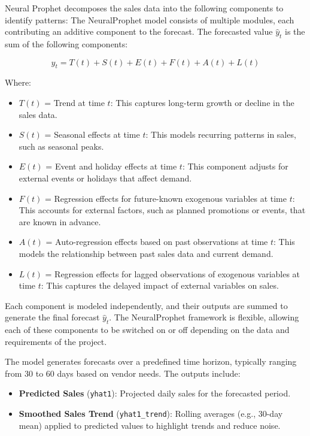 Neural Prophet decomposes the sales data into the following components to identify patterns:
The NeuralProphet model consists of multiple modules, each contributing an additive component to the forecast. The forecasted value \( \hat{y}_t \) is the sum of the following components:

\begin{equation}
    \hat{y}_t = T(t) + S(t) + E(t) + F(t) + A(t) + L(t)
\end{equation}

Where:
\begin{itemize}
    \item \( T(t) \) = Trend at time \( t \): This captures long-term growth or decline in the sales data.
    \item \( S(t) \) = Seasonal effects at time \( t \): This models recurring patterns in sales, such as seasonal peaks.
    \item \( E(t) \) = Event and holiday effects at time \( t \): This component adjusts for external events or holidays that affect demand.
    \item \( F(t) \) = Regression effects for future-known exogenous variables at time \( t \): This accounts for external factors, such as planned promotions or events, that are known in advance.
    \item \( A(t) \) = Auto-regression effects based on past observations at time \( t \): This models the relationship between past sales data and current demand.
    \item \( L(t) \) = Regression effects for lagged observations of exogenous variables at time \( t \): This captures the delayed impact of external variables on sales.
\end{itemize}

Each component is modeled independently, and their outputs are summed to generate the final forecast \( \hat{y}_t \). The NeuralProphet framework is flexible, allowing each of these components to be switched on or off depending on the data and requirements of the project.


The model generates forecasts over a predefined time horizon, typically ranging from 30 to 60 days based on vendor needs. The outputs include:

\begin{itemize}
    \item \textbf{Predicted Sales} (\texttt{yhat1}): Projected daily sales for the forecasted period.
    \item \textbf{Smoothed Sales Trend} (\texttt{yhat1\_trend}): Rolling averages (e.g., 30-day mean) applied to predicted values to highlight trends and reduce noise.
\end{itemize}

